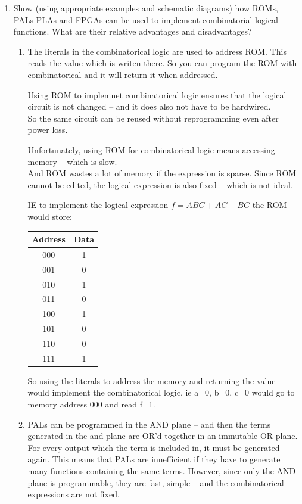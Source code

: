 \documentclass[10pt,\jkfside,a4paper]{article}
\begin{document}
\begin{enumerate}
\item Show (using appropriate examples and schematic diagrams) how ROMs, 
PALs PLAs and FPGAs can be used to implement combinatorial logical functions. 
What are their relative advantages and disadvantages?

\begin{enumerate}
\item The literals in the combinatorical logic are used to address ROM. This reads the 
value which is writen there. So you can program the ROM with combinatorical and 
it will return it when addressed.

Using ROM to implemnet combinatorical logic ensures that the logical circuit is not 
changed -- and it does also not have to be hardwired.\\
So the same circuit can be reused without reprogramming even after power loss.

Unfortunately, using ROM for combinatorical logic means accessing memory -- which is slow.\\
And ROM wastes a lot of memory if the expression is sparse.
Since ROM cannot be edited, the logical expression is also fixed -- which is not ideal.

IE to implement the logical expression $f = ABC + \bar A\bar C + \bar B\bar C$ the 
ROM would store:

\begin{tabular}{|c|c|}
\hline
Address & Data\\
\hline
000 & 1\\
001 & 0\\
010 & 1\\
011 & 0\\
100 & 1\\
101 & 0\\
110 & 0\\
111 & 1\\
\hline
\end{tabular}

So using the literals to address the memory and returning the value would implement the 
combinatorical logic. ie a=0, b=0, c=0 would go to memory address 000 and read f=1.

\item PALs can be programmed in the AND plane -- and then the terms generated in the and 
plane are OR'd together in an immutable OR plane. For every output which the term is included 
in, it must be generated again. This means that PALs are innefficient if they have to 
generate many functions containing the same terms. However, since only the AND plane is 
programmable, they are fast, simple -- and the combinatorical expressions are not fixed.


\end{enumerate}
\end{enumerate}
\end{document}
